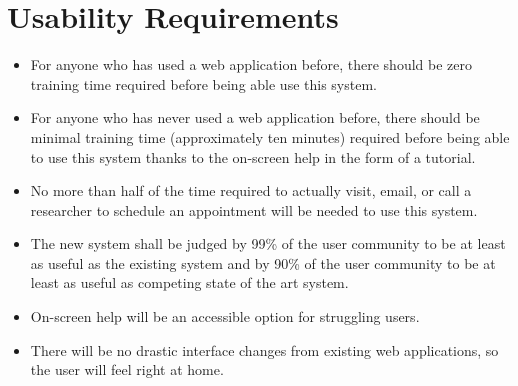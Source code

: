 \section{Usability Requirements}
\begin{itemize}
\item For anyone who has used a web application before, there should be zero training time required before being able use this system.
\item For anyone who has never used a web application before, there should be minimal training time (approximately ten minutes) required before being able to use this system thanks to the on-screen help in the form of a tutorial.
\item No more than half of the time required to actually visit, email, or call a researcher to schedule an appointment will be needed to use this system.
\item The new system shall be judged by 99\% of the user community to be at least as useful as the existing system and by 90\% of the user community to be at least as useful as competing state of the art system.
\item On-screen help will be an accessible option for struggling users.
\item There will be no drastic interface changes from existing web applications, so the user will feel right at home.
\end{itemize}
